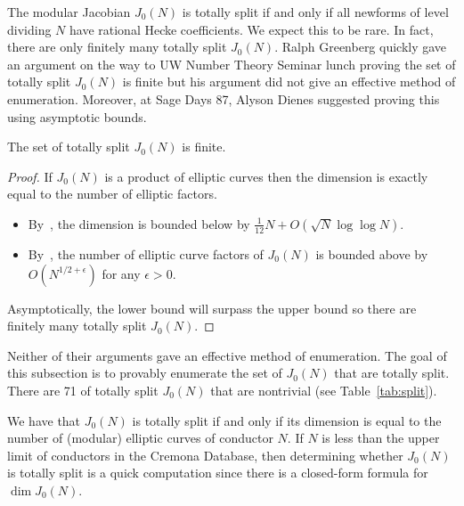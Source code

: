 The modular Jacobian $J_0(N)$ is totally split if and only if all newforms of
level dividing $N$ have rational Hecke coefficients. We expect this to be rare.
In fact, there are only finitely many totally split $J_0(N)$. Ralph Greenberg
quickly gave an argument on the way to UW Number Theory Seminar lunch proving
the set of totally split $J_0(N)$ is finite but his argument did not give an
effective method of enumeration. Moreover, at Sage Days 87, Alyson Dienes
suggested proving this using asymptotic bounds.
\begin{proposition}%
    \label{prop:totally_split}
    The set of totally split $J_0(N)$ is finite.
\end{proposition}
\begin{proof}
    If $J_0(N)$ is a product of elliptic curves then the dimension is
    exactly equal to the number of elliptic factors.
    \begin{itemize}
        \item
            By~\cite[Thm. 6]{martin:dimension}, the dimension is bounded below
            by $\frac{1}{12}N + O(\sqrt{N}\log\log N)$.
        \item
            By~\cite[Cor. 2]{brumer-silverman:number}, the number of elliptic
            curve factors of $J_0(N)$ is bounded above by $O(N^{1/2+\epsilon})$
            for any $\epsilon>0$.
    \end{itemize}
    Asymptotically, the lower bound will surpass the upper bound so there are
    finitely many totally split $J_0(N)$.
\end{proof}
Neither of their arguments gave an effective method of enumeration. The goal of
this subsection is to provably enumerate the set of $J_0(N)$ that are totally
split. There are 71 of totally split $J_0(N)$ that are nontrivial (see
Table~\ref{tab:split}).


We have that $J_0(N)$ is totally split if and only if its dimension is equal to
the number of (modular) elliptic curves of conductor $N$. If $N$ is less than
the upper limit of conductors in the Cremona Database, then determining whether
$J_0(N)$ is totally split is a quick computation since there is a closed-form
formula for $\dim J_0(N)$.

